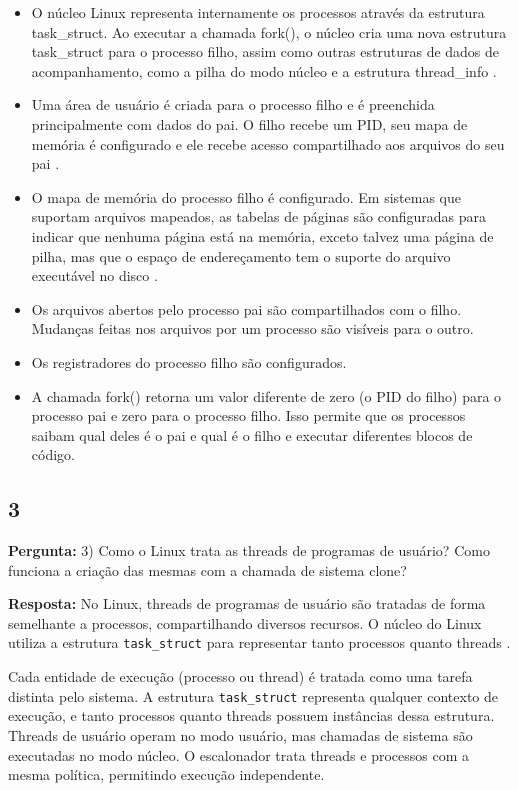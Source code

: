 \documentclass{article}
\begin{document}
\begin{itemize}
  \item O núcleo Linux representa internamente os processos através da estrutura task\_struct. Ao executar a chamada fork(), o núcleo cria uma nova estrutura task\_struct para o processo filho, assim como outras estruturas de dados de acompanhamento, como a pilha do modo núcleo e a estrutura thread\_info \parencite[p. 306]{tanenbaum2021}.
  \item Uma área de usuário é criada para o processo filho e é preenchida principalmente com dados do pai. O filho recebe um PID, seu mapa de memória é configurado e ele recebe acesso compartilhado aos arquivos do seu pai \parencite[p. 306]{tanenbaum2021}.
  \item O mapa de memória do processo filho é configurado. Em sistemas que suportam arquivos mapeados, as tabelas de páginas são configuradas para indicar que nenhuma página está na memória, exceto talvez uma página de pilha, mas que o espaço de endereçamento tem o suporte do arquivo executável no disco  \parencite[p. 512]{tanenbaum2021}.
  \item Os arquivos abertos pelo processo pai são compartilhados com o filho. Mudanças feitas nos arquivos por um processo são visíveis para o outro.
  \item Os registradores do processo filho são configurados.
  \item A chamada fork() retorna um valor diferente de zero (o PID do filho) para o processo pai e zero para o processo filho. Isso permite que os processos saibam qual deles é o pai e qual é o filho e executar diferentes blocos de código.
\end{itemize}


\subsection{3}

\textbf{Pergunta:} 3) Como o Linux trata as threads de programas de usuário? Como funciona a criação das mesmas com a chamada de sistema clone?\newline

\textbf{Resposta: }No Linux, threads de programas de usuário são tratadas de forma semelhante a processos, compartilhando diversos recursos. O núcleo do Linux utiliza a estrutura \texttt{task\_struct} para representar tanto processos quanto threads \parencite[p. 511]{tanenbaum2021}.

Cada entidade de execução (processo ou thread) é tratada como uma tarefa distinta pelo sistema. A estrutura \texttt{task\_struct} representa qualquer contexto de execução, e tanto processos quanto threads possuem instâncias dessa estrutura. Threads de usuário operam no modo usuário, mas chamadas de sistema são executadas no modo núcleo. O escalonador trata threads e processos com a mesma política, permitindo execução independente.
\end{document}
